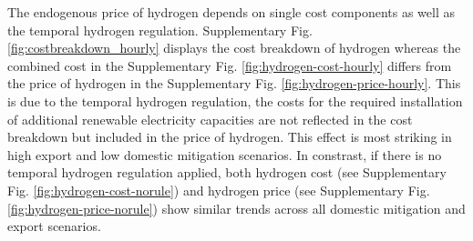 \label{subsec:electrolysis_op_comp}

The endogenous price of hydrogen depends on single cost components as well as the temporal hydrogen regulation. Supplementary Fig. \ref{fig:costbreakdown_hourly} displays the cost breakdown of hydrogen 
whereas the combined cost in the Supplementary Fig. \ref{fig:hydrogen-cost-hourly} differs from the price of hydrogen in the Supplementary Fig. \ref{fig:hydrogen-price-hourly}. This is due to the temporal hydrogen regulation, the costs for the required installation of additional renewable electricity capacities are not reflected in the cost breakdown but included in the price of hydrogen. This effect is most striking in high export and low domestic \co mitigation scenarios. 
In constrast, if there is no temporal hydrogen regulation applied, both hydrogen cost (see Supplementary Fig. \ref{fig:hydrogen-cost-norule}) and hydrogen price (see Supplementary Fig. \ref{fig:hydrogen-price-norule}) show similar trends across all domestic \co mitigation and export scenarios.


